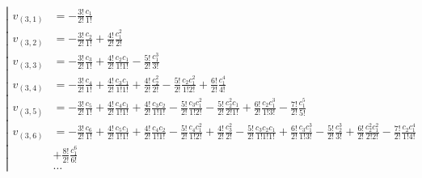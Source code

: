 \begin{equation*}
\left|
\begin{aligned}
v_{(3,1)} 
&= 
- \frac{3!}{2!} \frac{c_1}{1!} \\ 
v_{(3,2)} 
&= 
- \frac{3!}{2!} \frac{c_2}{1!} 
+ \frac{4!}{2!} \frac{c_1^2}{2!} \\
v_{(3,3)} 
&= 
- \frac{3!}{2!} \frac{c_3}{1!} 
+ \frac{4!}{2!} \frac{c_2 c_1}{1!1!} 
- \frac{5!}{2!} \frac{c_1^3}{3!} \\
v_{(3,4)}
&= 
- \frac{3!}{2!} \frac{c_4}{1!} 
+ \frac{4!}{2!} \frac{c_3 c_1}{1!1!} 
+ \frac{4!}{2!} \frac{c_2^2}{2!}
- \frac{5!}{2!} \frac{c_2 c_1^2}{1!2!}
+ \frac{6!}{2!} \frac{c_1^4}{4!} \\
v_{(3,5)}
&= 
- \frac{3!}{2!} \frac{c_5}{1!} 
+ \frac{4!}{2!} \frac{c_4 c_1}{1!1!} 
+ \frac{4!}{2!} \frac{c_3 c_2}{1!1!}
- \frac{5!}{2!} \frac{c_3 c_1^2}{1!2!}
- \frac{5!}{2!} \frac{c_2^2 c_1}{2!1!}
+ \frac{6!}{2!} \frac{c_2 c_1^3}{1!3!}
- \frac{7!}{2!} \frac{c_1^5}{5!} \\
v_{(3,6)}
&= 
- \frac{3!}{2!} \frac{c_6}{1!} 
+ \frac{4!}{2!} \frac{c_5 c_1}{1!1!} 
+ \frac{4!}{2!} \frac{c_4 c_2}{1!1!}
- \frac{5!}{2!} \frac{c_4 c_1^2}{1!2!}
+ \frac{4!}{2!} \frac{c_3^2}{2!}
- \frac{5!}{2!} \frac{c_3 c_2 c_1}{1!1!1!}
+ \frac{6!}{2!} \frac{c_3 c_1^3}{1!3!}
- \frac{5!}{2!} \frac{c_2^3}{3!}
+ \frac{6!}{2!} \frac{c_2^2 c_1^2}{2!2!}
- \frac{7!}{2!} \frac{c_2 c_1^4}{1!4!} \\
&
+ \frac{8!}{2!} \frac{c_1^6}{6!} \\
&\ldots
\end{aligned}
\right.
\end{equation*}
